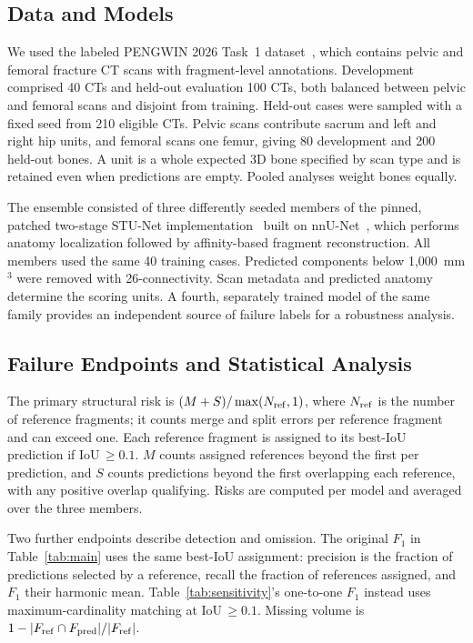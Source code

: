 \documentclass[conference]{IEEEtran}
\begin{document}
\subsection{Data and Models}
We used the labeled PENGWIN 2026 Task~1 dataset~\cite{pengwin2026}, which contains pelvic and femoral fracture CT scans with fragment-level annotations. Development comprised 40 CTs and held-out evaluation 100 CTs, both balanced between pelvic and femoral scans and disjoint from training. Held-out cases were sampled with a fixed seed from 210 eligible CTs. Pelvic scans contribute sacrum and left and right hip units, and femoral scans one femur, giving 80 development and 200 held-out bones. A unit is a whole expected 3D bone specified by scan type and is retained even when predictions are empty. Pooled analyses weight bones equally.

The ensemble consisted of three differently seeded members of the pinned, patched two-stage STU-Net implementation~\cite{abbc} built on nnU-Net~\cite{isensee2021}, which performs anatomy localization followed by affinity-based fragment reconstruction. All members used the same 40 training cases. Predicted components below 1{,}000~mm$^3$ were removed with 26-connectivity. Scan metadata and predicted anatomy determine the scoring units. A fourth, separately trained model of the same family provides an independent source of failure labels for a robustness analysis.

\subsection{Failure Endpoints and Statistical Analysis}
The primary structural risk is $(M+S)/\max(N_{\rm ref},1)$, where $N_{\rm ref}$ is the number of reference fragments; it counts merge and split errors per reference fragment and can exceed one. Each reference fragment is assigned to its best-IoU prediction if IoU\,$\geq0.1$. $M$ counts assigned references beyond the first per prediction, and $S$ counts predictions beyond the first overlapping each reference, with any positive overlap qualifying. Risks are computed per model and averaged over the three members.

Two further endpoints describe detection and omission. The original $F_1$ in Table~\ref{tab:main} uses the same best-IoU assignment: precision is the fraction of predictions selected by a reference, recall the fraction of references assigned, and $F_1$ their harmonic mean. Table~\ref{tab:sensitivity}'s one-to-one $F_1$ instead uses maximum-cardinality matching at IoU\,$\geq0.1$. Missing volume is $1-|F_{\rm ref}\cap F_{\rm pred}|/|F_{\rm ref}|$.
\end{document}
